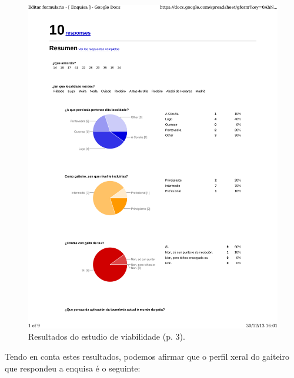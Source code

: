 \begin{figure}[htbp]
 \centering
 \includegraphics[scale=0.7,page=3,keepaspectratio=true,clip,trim=0cm 22cm 0cm 0.5cm]{./imagenes/enquisa.pdf}
 \caption{Resultados do estudio de viabilidade (p. 3).}
 \label{figura:ResultadosEstudioViabilidade3}
\end{figure}

Tendo en conta estes resultados, podemos afirmar que o perfil xeral do gaiteiro
que respondeu a enquisa é o seguinte:

